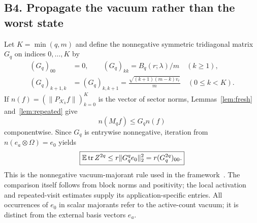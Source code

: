 \documentclass[11pt]{article}
\numberwithin{equation}{section}
\theoremstyle{definition}\newtheorem{definition}[theorem]{Definition}
\theoremstyle{remark}\newtheorem{remark}[theorem]{Remark}
\newcommand{\tr}{\operatorname{tr}}\newcommand{\Ent}{\operatorname{Ent}}
\newcommand{\norm}[1]{\lVert#1\rVert}\newcommand{\ip}[2]{\langle#1,#2\rangle}
\begin{document}
\subsection{B4. Propagate the vacuum rather than the worst state}
Let $K=\min(q,m)$ and define the nonnegative symmetric tridiagonal matrix $G_q$
on indices $0,\ldots,K$ by
\begin{align}
 (G_q)_{00}&=0,\qquad (G_q)_{kk}=B_q(r;\lambda)/m\quad(k\ge1),\nonumber\\
 (G_q)_{k+1,k}&=(G_q)_{k,k+1}
 =\frac{\sqrt{(k+1)(m-k)v_r}}m\quad(0\le k<K).
 \label{eq:G}
\end{align}
If $n(f)=(\norm{P_{\mathcal K_k}f})_{k=0}^K$ is the vector of sector norms,
Lemmas~\ref{lem:fresh} and~\ref{lem:repeated} give
\begin{equation}\label{eq:sector-step}
 n(M_qf)\le G_qn(f)
\end{equation}
componentwise. Since $G_q$ is entrywise nonnegative, iteration from
$n(e_a\otimes\Omega)=e_0$ yields
\begin{equation}\label{eq:stationary}
 \boxed{\E\tr Z^{2q}\le r\norm{G_q^qe_0}_2^2=r(G_q^{2q})_{00}.}
\end{equation}
This is the nonnegative vacuum-majorant rule used in the framework~\cite{Framework}.
The comparison itself follows from block norms and positivity; the local
activation and repeated-visit estimates supply its application-specific entries.
All occurrences of $e_0$ in scalar majorants refer to the active-count vacuum;
it is distinct from the external basis vectors $e_a$.
\end{document}
